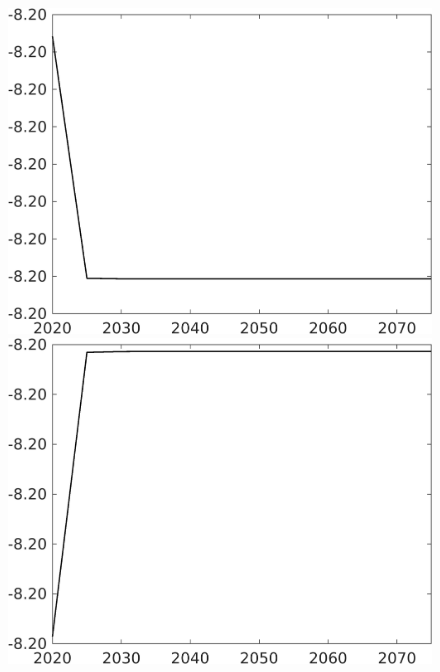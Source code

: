 \documentclass[12pt]{article}
\begin{document}
\begin{figure}[h!!]
\begin{minipage}[]{0.32\textwidth}
	\end{minipage}	
	\begin{minipage}[]{0.32\textwidth}
		\includegraphics[width=1\textwidth]{../../codding_model/own_basedOnFried/optimalPol_010922_revision/figures/all_13Sept22/CompTaul_LFBAUPer_Reg0_Lf_spillover0_nsk1_xgr1_knspil0_sep1_countec0_GovRev0_etaa0.79.png}
	\end{minipage}	
	\begin{minipage}[]{0.32\textwidth}
		\includegraphics[width=1\textwidth]{../../codding_model/own_basedOnFried/optimalPol_010922_revision/figures/all_13Sept22/CompTaul_LFBAUPer_Reg0_Lg_spillover0_nsk1_xgr1_knspil0_sep1_countec0_GovRev0_etaa0.79.png}

\end{minipage}
\end{figure}
\end{document}
